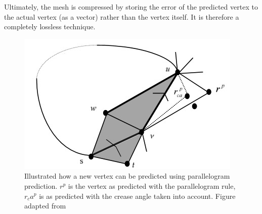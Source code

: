 Ultimately, the mesh is compressed by storing the error of the predicted vertex to the actual vertex (as a vector) rather than the vertex itself. 
It is therefore a completely lossless technique.

\begin{figure}[h!]
    \centering
    \includegraphics[scale=0.8]{figs/related_work/parallelogram_rule.jpg}
    \caption{Illustrated how a new vertex can be predicted using parallelogram prediction. \(r^p\) is the vertex as predicted with the parallelogram rule, \(r_ca^p \) is as predicted with the crease angle taken into account. Figure adapted from \citet{gotsman-touma-gi98}}
    \label{fig:parallelogram}
\end{figure}







